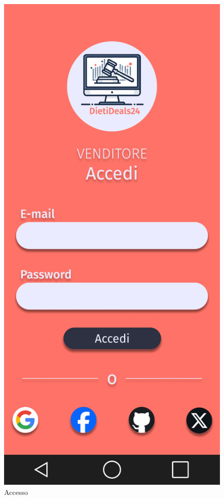     \begin{figure}[!htb]
        \begin{minipage}{0.32\textwidth}
            \centering
            \includegraphics[width=.7\linewidth]{Immagini/Frames/2.pdf}
            \caption{Accesso}
        \end{minipage}\hfill
        \begin{minipage}{0.32\textwidth}
            \centering

\end{minipage}
\end{figure}

